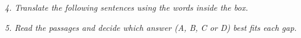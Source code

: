 \documentclass{article}
\begin{document}
\noindent \textit{4. Translate the following sentences using the words inside the box.}
\begin{CJK*}{UTF8}{gbsn}
%
%
%
%
%
%
%
%
%
%
%
%
%
%
%
%
%
%
%
%
\end{CJK*}

\noindent \textit{5. Read the passages and decide which answer (A, B, C or D) best fits each gap.}

%
%
%
%
%
%
%
%
%
%
%
%
%
%
%
%
%
%
%
%
\end{document}

